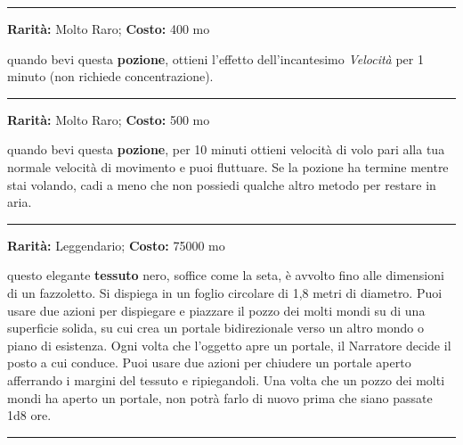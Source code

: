\begin{multicols}{2}
\smallskip\noindent\rule{\linewidth}{2pt}  \hypertarget{PozionediVelocità}{}\medskip{}\noindent\label{PozionediVelocità}

\textbf{Rarità:} Molto Raro; \textbf{Costo:} 400 mo

quando bevi questa \textbf{pozione}, ottieni l'effetto dell'incantesimo \emph{Velocità} per 1 minuto (non richiede concentrazione).

\smallskip\noindent\rule{\linewidth}{2pt}  \hypertarget{PozionediVolo}{}\medskip{}\noindent\label{PozionediVolo}

\textbf{Rarità:} Molto Raro; \textbf{Costo:} 500 mo

quando bevi questa \textbf{pozione}, per 10 minuti ottieni velocità di volo pari alla tua normale velocità di movimento e puoi fluttuare. Se la pozione ha termine mentre stai volando, cadi a meno che non possiedi qualche altro metodo per restare in aria.

\smallskip\noindent\rule{\linewidth}{2pt}  \hypertarget{PozzodeiMoltiMondi}{}\medskip{}\noindent\label{PozzodeiMoltiMondi}

\textbf{Rarità:} Leggendario; \textbf{Costo:} 75000 mo

questo elegante \textbf{tessuto} nero, soffice come la seta, è avvolto fino alle dimensioni di un fazzoletto. Si dispiega in un foglio circolare di 1,8 metri di diametro. Puoi usare due azioni per dispiegare e piazzare il pozzo dei molti mondi su di una superficie solida, su cui crea un portale bidirezionale verso un altro mondo o piano di esistenza. Ogni volta che l'oggetto apre un portale, il Narratore decide il posto a cui conduce. Puoi usare due azioni per chiudere un portale aperto afferrando i margini del tessuto e ripiegandoli. Una volta che un pozzo dei molti mondi ha aperto un portale, non potrà farlo di nuovo prima che siano passate 1d8 ore.

\smallskip\noindent\rule{\linewidth}{2pt}  \hypertarget{ResistenzaalVeleno}{}\medskip{}\noindent\label{ResistenzaalVeleno}


\end{multicols}
